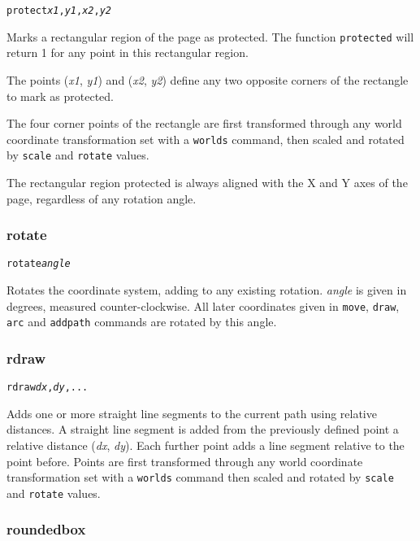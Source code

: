 \begin{alltt}
protect \textit{x1}, \textit{y1}, \textit{x2}, \textit{y2}
\end{alltt}

Marks a rectangular region of the page as protected.
The function \texttt{protected} will return 1 for any
point in this rectangular region.

The points
(\textit{x1}, \textit{y1}) and (\textit{x2}, \textit{y2}) define
any two opposite corners of the rectangle to mark as protected.

The four corner points of the rectangle
are first transformed through any world coordinate
transformation set with a \texttt{worlds} command,
then scaled and rotated by \texttt{scale}
and \texttt{rotate} values.

The rectangular region protected is always aligned with the X
and Y axes of the page, regardless of any rotation angle.

\subsubsection{rotate}

\begin{alltt}
rotate \textit{angle}
\end{alltt}

Rotates the coordinate system, adding to any existing rotation.  \textit{angle}
is given in degrees, measured counter-clockwise.  All later coordinates given
in \texttt{move}, \texttt{draw}, \texttt{arc} and \texttt{addpath} commands are
rotated by this angle.

\subsubsection{rdraw}

\begin{alltt}
rdraw \textit{dx}, \textit{dy}, ...
\end{alltt}

Adds one or more straight line segments to the current path
using relative distances.
A straight line segment is added from the previously defined point
a relative distance (\textit{dx}, \textit{dy}).  Each further
point adds a line segment relative to the point before.
Points are first transformed through any world coordinate
transformation set with a \texttt{worlds} command
then scaled and rotated by \texttt{scale}
and \texttt{rotate} values.

\subsubsection{roundedbox}

